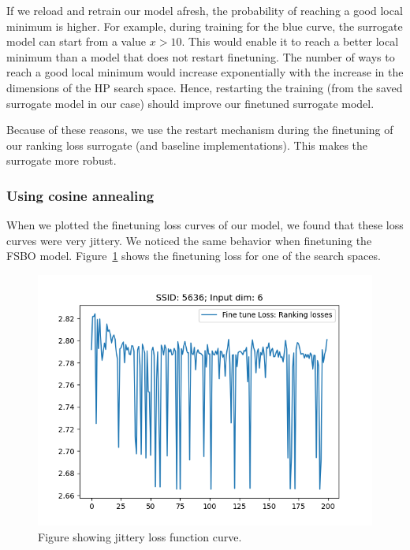 \documentclass[12pt, twoside, ngerman]{report}
\begin{document}
If we reload and retrain our model afresh, the probability of reaching a good local minimum is higher. For example, during training for the blue curve, the surrogate model can start from a value $x > 10$. This would enable it to reach a better local minimum than a model that does not restart finetuning.
The number of ways to reach a good local minimum would increase exponentially with the increase in the dimensions of the HP search space.
Hence, restarting the training (from the saved surrogate model in our case) should improve our finetuned surrogate model.

Because of these reasons,  we use the restart mechanism during the finetuning of our ranking loss surrogate (and baseline implementations).
This makes the surrogate more robust.

\subsubsection{Using cosine annealing}

When we plotted the finetuning loss curves of our model, we found that these loss curves were very jittery.
We noticed the same behavior when finetuning the FSBO model.
Figure~\ref{fig:jitteryFTLoss} shows the finetuning loss for one of the search spaces.

\begin{figure}[htb]
  \centering
    \includegraphics[scale=0.45]{images/jitteryFTLoss}
    \caption{Figure showing jittery loss function curve.}
    \label{fig:jitteryFTLoss}
\end{figure}
\end{document}
